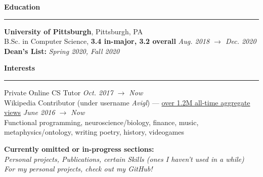 \documentclass[10pt]{article}
\begin{document}
\begin{flushleft}
		\vspace{1.5mm}
		{\large \raggedright \textbf{Education}}
		\vspace{1.25mm}
	
		\hrule
		
		\vspace{2.25mm}
		\textbf{University of Pittsburgh}, Pittsburgh, PA\\
      	{\small B.Sc. in Computer Science, \textbf{3.4 in-major, 3.2 overall} \hfill \textit{Aug. 2018 $\rightarrow$ Dec. 2020}}\\
		{\small \textbf{Dean's List:} \textit{Spring 2020, Fall 2020}}\\

		\vspace{1.25mm}
		{\large \raggedright \textbf{Interests}}
		\vspace{1.25mm}
	
		\hrule
	
		\vspace{2.25mm}
		Private Online CS Tutor \hfill \textit{\small Oct. 2017 $\rightarrow$ Now}\\
		Wikipedia Contributor (under username \textit{Avigl}) --- \href{https://pageviews.wmcloud.org/?project=en.wikipedia.org&platform=all-access&agent=user&redirects=0&range=all-time&pages=Timeline_of_social_media|Timeline_of_online_advertising|Timeline_of_e-commerce|Screening_Partnership_Program|Silicon_Valley_Education_Foundation|Chicago_Community_Trust}{over 1.2M all-time aggregate views} \hfill \textit{\small June 2016 $\rightarrow$ Now}\\
		Functional programming, neuroscience/biology, finance, music, metaphysics/ontology, writing poetry, history, videogames

		\vspace*{\fill}
		\textbf{\small Currently omitted or in-progress sections:}\\ 
		\textit{\small Personal projects, Publications, certain Skills (ones I haven't used in a while)}\\
		{\footnotesize \textit{For my personal projects, check out my GitHub!}}
	\end{flushleft}
\end{document}
